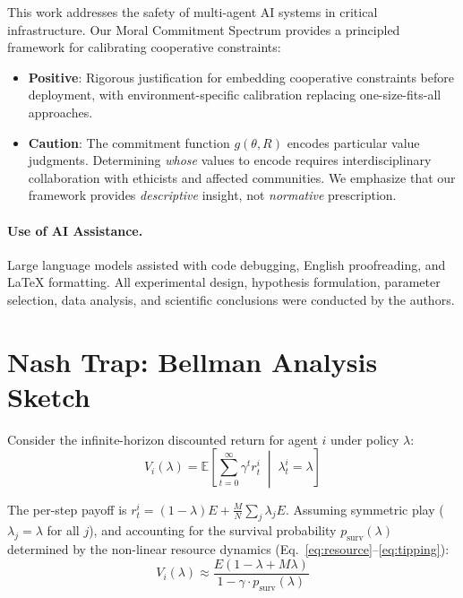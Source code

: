 \documentclass{article}
\begin{document}
This work addresses the safety of multi-agent AI systems in critical infrastructure.
Our Moral Commitment Spectrum provides a principled framework for calibrating cooperative constraints:
\begin{itemize}
    \item \textbf{Positive}: Rigorous justification for embedding cooperative constraints before deployment, with environment-specific calibration replacing one-size-fits-all approaches.
    \item \textbf{Caution}: The commitment function $g(\theta, R)$ encodes particular value judgments. Determining \emph{whose} values to encode requires interdisciplinary collaboration with ethicists and affected communities.
    We emphasize that our framework provides \textit{descriptive} insight, not \textit{normative} prescription.
\end{itemize}

\paragraph{Use of AI Assistance.} Large language models assisted with code debugging, English proofreading, and LaTeX formatting. All experimental design, hypothesis formulation, parameter selection, data analysis, and scientific conclusions were conducted by the authors.




\newpage
\appendix

\section{Nash Trap: Bellman Analysis Sketch}
\label{app:nash_trap}

Consider the infinite-horizon discounted return for agent $i$ under policy $\lambda$:
\begin{equation}
V_i(\lambda) = \mathbb{E}\left[\sum_{t=0}^{\infty} \gamma^t r_t^i \;\middle|\; \lambda_t^i = \lambda\right]
\end{equation}

The per-step payoff is $r_t^i = (1 - \lambda) E + \frac{M}{N} \sum_j \lambda_j E$.
Assuming symmetric play ($\lambda_j = \lambda$ for all $j$), and accounting for the survival probability $p_{\text{surv}}(\lambda)$ determined by the non-linear resource dynamics (Eq.~\ref{eq:resource}--\ref{eq:tipping}):
\begin{equation}
V_i(\lambda) \approx \frac{E(1 - \lambda + M\lambda)}{1 - \gamma \cdot p_{\text{surv}}(\lambda)}
\end{equation}
\end{document}
